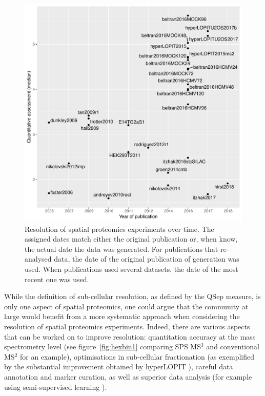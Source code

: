 \documentclass[12pt]{article}\usepackage[]{graphicx}\usepackage[]{color}
\newenvironment{knitrout}{}{} %
\begin{document}
\begin{figure}[h]
  \centering
\begin{knitrout}
\color{fgcolor}
\includegraphics[width=0.8\linewidth]{figure/restime-1} 

\end{knitrout}
\caption{Resolution of spatial proteomics experiments over time. The
  assigned dates match either the original publication or, when know,
  the actual date the data was generated. For publications that
  re-analysed data, the date of the original publication of generation
  was used. When publications used several datasets, the date of the
  most recent one was used.}
  \label{fig:restime}
\end{figure}


While the definition of sub-cellular resolution, as defined by the
QSep measure, is only one aspect of spatial proteomics, one could
argue that the community at large would benefit from a more systematic
approach when considering the resolution of spatial proteomics
experiments. Indeed, there are various aspects that can be worked on
to improve resolution: quantitation accuracy at the mass spectrometry
level (see figure~\ref{fig:hexbin1} comparing SPS MS$^3$ and
conventional MS$^2$ for an example), optimisations in sub-cellular
fractionation (as exemplified by the substantial improvement obtained
by hyperLOPIT \citep{Christoforou:2016}), careful data annotation and
marker curation, as well as superior data analysis (for example using
semi-supervised learning \citet{Breckels:2013}).
\end{document}
